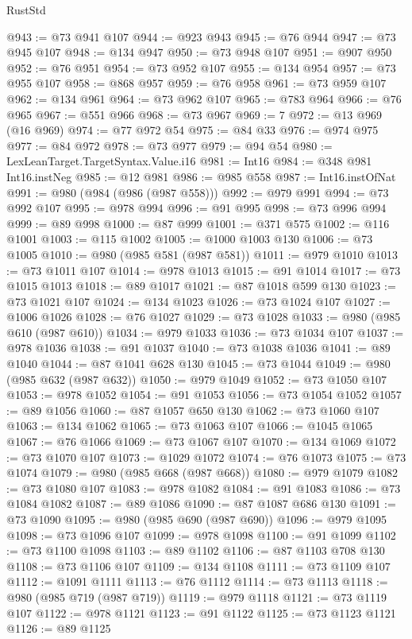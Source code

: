 \begin{lexlean}{RustStd}
\begin{coremodule}
@943 := @73 @941 @107
@944 := @923 @943
@945 := @76 @944
@947 := @73 @945 @107
@948 := @134 @947
@950 := @73 @948 @107
@951 := @907 @950
@952 := @76 @951
@954 := @73 @952 @107
@955 := @134 @954
@957 := @73 @955 @107
@958 := @868 @957
@959 := @76 @958
@961 := @73 @959 @107
@962 := @134 @961
@964 := @73 @962 @107
@965 := @783 @964
@966 := @76 @965
@967 := @551 @966
@968 := @73 @967
@969 := 7
@972 := @13 @969 (@16 @969)
@974 := @77 @972 @54
@975 := @84 @33
@976 := @974 @975
@977 := @84 @972
@978 := @73 @977
@979 := @94 @54
@980 := LexLeanTarget.TargetSyntax.Value.i16
@981 := Int16
@984 := @348 @981 Int16.instNeg
@985 := @12 @981
@986 := @985 @558
@987 := Int16.instOfNat
@991 := @980 (@984 (@986 (@987 @558)))
@992 := @979 @991
@994 := @73 @992 @107
@995 := @978 @994
@996 := @91 @995
@998 := @73 @996 @994
@999 := @89 @998
@1000 := @87 @999
@1001 := @371 @575
@1002 := @116 @1001
@1003 := @115 @1002
@1005 := @1000 @1003 @130
@1006 := @73 @1005
@1010 := @980 (@985 @581 (@987 @581))
@1011 := @979 @1010
@1013 := @73 @1011 @107
@1014 := @978 @1013
@1015 := @91 @1014
@1017 := @73 @1015 @1013
@1018 := @89 @1017
@1021 := @87 @1018 @599 @130
@1023 := @73 @1021 @107
@1024 := @134 @1023
@1026 := @73 @1024 @107
@1027 := @1006 @1026
@1028 := @76 @1027
@1029 := @73 @1028
@1033 := @980 (@985 @610 (@987 @610))
@1034 := @979 @1033
@1036 := @73 @1034 @107
@1037 := @978 @1036
@1038 := @91 @1037
@1040 := @73 @1038 @1036
@1041 := @89 @1040
@1044 := @87 @1041 @628 @130
@1045 := @73 @1044
@1049 := @980 (@985 @632 (@987 @632))
@1050 := @979 @1049
@1052 := @73 @1050 @107
@1053 := @978 @1052
@1054 := @91 @1053
@1056 := @73 @1054 @1052
@1057 := @89 @1056
@1060 := @87 @1057 @650 @130
@1062 := @73 @1060 @107
@1063 := @134 @1062
@1065 := @73 @1063 @107
@1066 := @1045 @1065
@1067 := @76 @1066
@1069 := @73 @1067 @107
@1070 := @134 @1069
@1072 := @73 @1070 @107
@1073 := @1029 @1072
@1074 := @76 @1073
@1075 := @73 @1074
@1079 := @980 (@985 @668 (@987 @668))
@1080 := @979 @1079
@1082 := @73 @1080 @107
@1083 := @978 @1082
@1084 := @91 @1083
@1086 := @73 @1084 @1082
@1087 := @89 @1086
@1090 := @87 @1087 @686 @130
@1091 := @73 @1090
@1095 := @980 (@985 @690 (@987 @690))
@1096 := @979 @1095
@1098 := @73 @1096 @107
@1099 := @978 @1098
@1100 := @91 @1099
@1102 := @73 @1100 @1098
@1103 := @89 @1102
@1106 := @87 @1103 @708 @130
@1108 := @73 @1106 @107
@1109 := @134 @1108
@1111 := @73 @1109 @107
@1112 := @1091 @1111
@1113 := @76 @1112
@1114 := @73 @1113
@1118 := @980 (@985 @719 (@987 @719))
@1119 := @979 @1118
@1121 := @73 @1119 @107
@1122 := @978 @1121
@1123 := @91 @1122
@1125 := @73 @1123 @1121
@1126 := @89 @1125

\end{coremodule}
\end{lexlean}
